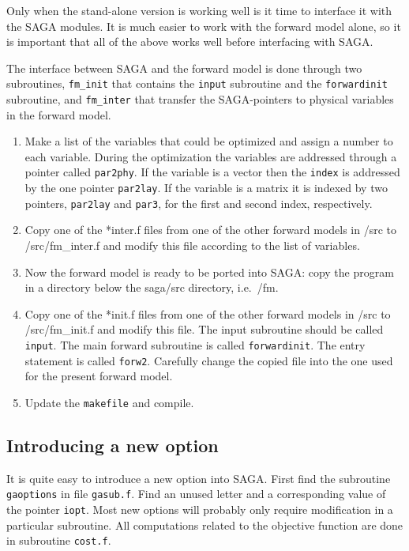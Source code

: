 \documentclass{saclantc}
\begin{document}
Only when the stand-alone version is working well is it time to 
interface it with the {\sf SAGA} modules. 
It is much easier to work with the forward model alone, so
it is important that all of the above works well before
interfacing with {\sf SAGA}.

The interface between {\sf SAGA} and the forward model is done through two
subroutines, {\tt fm\_init} that contains the {\tt input} subroutine and the
{\tt forwardinit} subroutine, and {\tt fm\_inter} that transfer the
{\sf SAGA}-pointers to physical variables in the forward model.


\begin{enumerate}
\item
 Make a list of the variables that could be optimized and assign
     a number to each variable.
     During the optimization the variables are addressed through a
     pointer called {\tt par2phy}.
     If the variable is a vector then the {\tt index} is addressed by the
one pointer {\tt par2lay}.
     If the variable is a matrix it is indexed by two 
     pointers, {\tt par2lay} and {\tt par3}, for the first and second
     index, respectively.     
\item
 Copy one of the *inter.f files from  one of the other forward
models  in /src to /src/fm\_inter.f and modify this 
     file according to the list of variables.

\item Now the forward model is ready to be ported into {\sf SAGA}:
 copy the program in a directory below the saga/src directory, i.e.\ /fm.
\item
   Copy one of the *init.f files from  one of the other forward
models  in /src to /src/fm\_init.f and modify this 
     file.   The input subroutine should be called {\tt input}.
     The main forward subroutine is called {\tt forwardinit}.
     The entry statement is called {\tt forw2}.
     Carefully change the copied file into the one used for the present
forward model.

\item Update the {\tt makefile} and compile.
\end{enumerate}

\subsection{Introducing a new option}
It is quite easy to introduce a new option into {\sf SAGA}. First find the 
subroutine  {\tt gaoptions} in file {\tt gasub.f}. Find an unused letter
and a corresponding value of the pointer {\tt iopt}. Most new options
will probably only require modification in a particular subroutine. 
All computations related to the objective function are done in
subroutine {\tt cost.f}.
\end{document}
